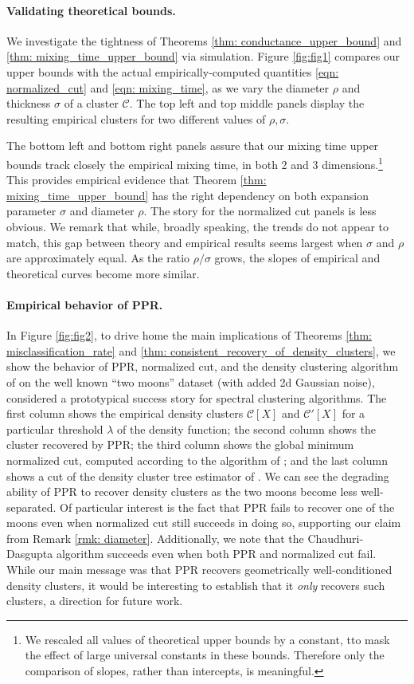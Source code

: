 \documentclass{article}
\newcommand{\1}{\mathbf{1}}
\newcommand{\Xbf}{X}             %
\newcommand{\Cset}{\mathcal{C}}
\theoremstyle{aldenthm}
\theoremstyle{aldenrmrk}
\begin{document}
\paragraph{Validating theoretical bounds.}  We investigate the tightness of
Theorems \ref{thm: conductance_upper_bound} and \ref{thm:
  mixing_time_upper_bound} via simulation. Figure \ref{fig:fig1} compares our
upper bounds with the actual empirically-computed quantities \eqref{eqn:
  normalized_cut} and \eqref{eqn: mixing_time}, as we vary the diameter $\rho$
and thickness $\sigma$ of a cluster $\Cset$. The top left and top middle panels
display the resulting empirical clusters for two different values of
$\rho,\sigma$. 

The bottom left and bottom right panels assure that our mixing  
time upper bounds track closely the empirical mixing time, in both 2 and 3 
dimensions.\footnote{We rescaled all values of theoretical upper
  bounds by a constant, tto mask the effect of large universal constants
  in these bounds. Therefore only the comparison of slopes, rather than
  intercepts, is meaningful.} This provides empirical evidence that Theorem
\ref{thm: mixing_time_upper_bound} has the right dependency on both expansion
parameter $\sigma$ and diameter $\rho$. The story for the normalized cut panels
is less obvious. We remark that while, broadly speaking, the trends do not
appear to match, this gap between theory and empirical results seems largest
when $\sigma $ and $\rho$ are approximately equal. As the ratio $\rho/\sigma$
grows, the slopes of empirical and theoretical curves become more similar.

\paragraph{Empirical behavior of PPR.} In Figure \ref{fig:fig2}, to drive home
the main implications of Theorems \ref{thm: misclassification_rate} and
\ref{thm: consistent_recovery_of_density_clusters}, we show the
behavior of PPR, normalized cut, and the density clustering algorithm of
\citet{chaudhuri2010} on the well known ``two moons'' dataset (with added 2d 
Gaussian noise), considered a prototypical success story for spectral clustering
algorithms. The first column shows the empirical density clusters $\Cset[\Xbf]$
and $\Cset'[\Xbf]$ for a particular threshold $\lambda$ of the density function; the 
second column shows the cluster recovered by PPR; the third column shows the
global minimum normalized cut, computed according to the algorithm of
\citet{szlam2010}; and the last column shows a cut of the density cluster tree
estimator of \citet{chaudhuri2010}.  We can see the degrading ability of PPR to
recover density clusters as the two moons become less well-separated. Of 
particular interest is the fact that PPR fails to recover one of the moons even
when normalized cut still succeeds in doing so, supporting our claim from Remark
\ref{rmk: diameter}. Additionally, we note that the Chaudhuri-Dasgupta algorithm 
succeeds even when both PPR and normalized cut fail.  While our main message was
that PPR recovers geometrically well-conditioned density clusters, it would be  
interesting to establish that it \emph{only} recovers such clusters, a direction
for future work.   
\end{document}
